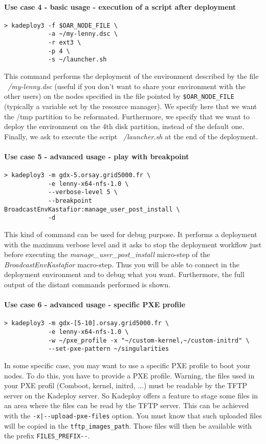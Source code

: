 \documentclass[a4wide,10pt,oneside]{book}
\begin{document}
\paragraph{Use case 4 - basic usage - execution of a script after deployment}
\begin{verbatim}
> kadeploy3 -f $OAR_NODE_FILE \
            -a ~/my-lenny.dsc \
            -r ext3 \
            -p 4 \
            -s ~/launcher.sh
\end{verbatim}
This command performs the deployment of the environment described by the file \textit{~/my-lenny.dsc} (useful if you don't want to share your environment with the other users) on the nodes specified in the file pointed by \texttt{\$OAR\_NODE\_FILE} (typically a variable set by the resource manager). We specify here that we want the /tmp partition to be reformated. Furthermore, we specify that we want to deploy the environment on the 4th disk partition, instead of the default one. Finally, we ask to execute the script \textit{~/launcher.sh} at the end of the deployment.

\paragraph{Use case 5 - advanced usage - play with breakpoint}
\begin{verbatim}
> kadeploy3 -m gdx-5.orsay.grid5000.fr \
            -e lenny-x64-nfs-1.0 \
            --verbose-level 5 \
            --breakpoint BroadcastEnvKastafior:manage_user_post_install \
            -d
\end{verbatim}
This kind of command can be used for debug purpose. It performs a deployment with the maximum verbose level and it asks to stop the deployment workflow just before executing the \textit{manage\_user\_post\_install} micro-step of the \textit{BroadcastEnvKastafior} macro-step. Thus you will be able to connect in the deployment environment and to debug what you want. Furthermore, the full output of the distant commands performed is shown.

\paragraph{Use case 6 - advanced usage - specific PXE profile}
\begin{verbatim}
> kadeploy3 -m gdx-[5-10].orsay.grid5000.fr \
            -e lenny-x64-nfs-1.0 \
            -w ~/pxe_profile -x "~/custom-kernel,~/custom-initrd" \
            --set-pxe-pattern ~/singularities
\end{verbatim}
In some specific case, you may want to use a specific PXE profile to boot your nodes. To do this, you have to provide a PXE profile. Warning, the files used in your PXE profil (Comboot, kernel, initrd, ...) must be readable by the TFTP server on the Kadeploy server. So Kadeploy offers a feature to stage some files in an area where the files can be read by the TFTP server. This can be achieved with the \texttt{-x|-{}-upload-pxe-files} option. You must know that such uploaded files will be copied in the \texttt{tftp\_images\_path}. Those files will then be available with the prefix \texttt{FILES\_PREFIX-{}-}.
\end{document}
